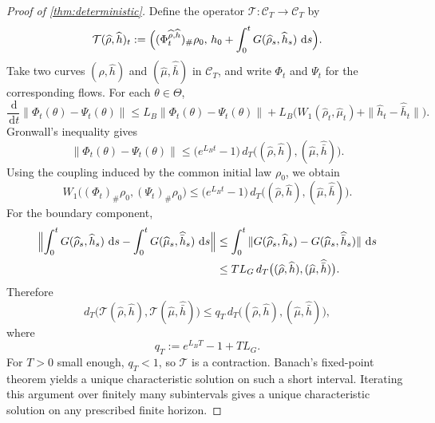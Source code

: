 \documentclass[11pt]{article}
\theoremstyle{definition}
\newcommand{\W}{W_1}
\newcommand{\dd}{\,\mathrm{d}}
\begin{document}
\begin{proof}[Proof of \cref{thm:deterministic}]
Define the operator $\mathcal T:\mathcal C_T\to\mathcal C_T$ by
\[
  \mathcal T(\widehat\rho,\widehat h)_t
  :=
  \Bigl(
    (\Phi_t^{\widehat\rho,\widehat h})_\#\rho_0,\,
    h_0+\int_0^t G(\widehat\rho_s,\widehat h_s)\,\dd s
  \Bigr).
\]
Take two curves $(\widehat\rho,\widehat h)$ and $(\widehat\mu,\widehat{\bar h})$
in $\mathcal C_T$, and write $\Phi_t$ and $\Psi_t$ for the corresponding flows.
For each $\theta\in\Theta$,
\[
  \frac{\dd}{\dd t}\|\Phi_t(\theta)-\Psi_t(\theta)\|
  \le
  L_B\|\Phi_t(\theta)-\Psi_t(\theta)\|
  +
  L_B
  \bigl(
    \W(\widehat\rho_t,\widehat\mu_t)
    +
    \|\widehat h_t-\widehat{\bar h}_t\|
  \bigr).
\]
Gronwall's inequality gives
\[
  \|\Phi_t(\theta)-\Psi_t(\theta)\|
  \le
  \bigl(e^{L_B t}-1\bigr)\,
  d_T\bigl((\widehat\rho,\widehat h),(\widehat\mu,\widehat{\bar h})\bigr).
\]
Using the coupling induced by the common initial law $\rho_0$, we obtain
\[
  \W\bigl(
    (\Phi_t)_\#\rho_0,
    (\Psi_t)_\#\rho_0
  \bigr)
  \le
  \bigl(e^{L_B t}-1\bigr)\,
  d_T\bigl((\widehat\rho,\widehat h),(\widehat\mu,\widehat{\bar h})\bigr).
\]
For the boundary component,
\begin{align*}
  \Bigl\|
    \int_0^t G(\widehat\rho_s,\widehat h_s)\,\dd s
    -
    \int_0^t G(\widehat\mu_s,\widehat{\bar h}_s)\,\dd s
  \Bigr\|
  &\le
  \int_0^t
  \|G(\widehat\rho_s,\widehat h_s)-G(\widehat\mu_s,\widehat{\bar h}_s)\|
  \,\dd s\\
  &\le
  T L_G\,
  d_T\bigl((\widehat\rho,\widehat h),(\widehat\mu,\widehat{\bar h})\bigr).
\end{align*}
Therefore
\[
  d_T\bigl(
    \mathcal T(\widehat\rho,\widehat h),
    \mathcal T(\widehat\mu,\widehat{\bar h})
  \bigr)
  \le
  q_T\,
  d_T\bigl((\widehat\rho,\widehat h),(\widehat\mu,\widehat{\bar h})\bigr),
\]
where
\[
  q_T:=e^{L_B T}-1+T L_G.
\]
For $T>0$ small enough, $q_T<1$, so $\mathcal T$ is a contraction. Banach's
fixed-point theorem yields a unique characteristic solution on such a short
interval. Iterating this argument over finitely many subintervals gives a
unique characteristic solution on any prescribed finite horizon.


\end{proof}
\end{document}
